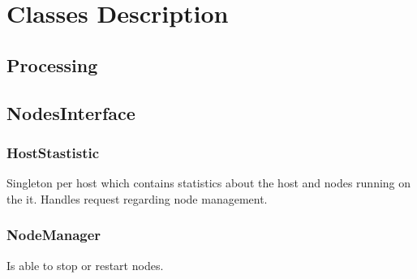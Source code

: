 \chapter{Classes Description}

\section{Processing}


\section{NodesInterface}

\subsection{HostStastistic}
Singleton per host which contains statistics about the host and nodes running on the it. Handles request regarding node management.

\subsection{NodeManager}
Is able to stop or restart nodes.





\newpage
